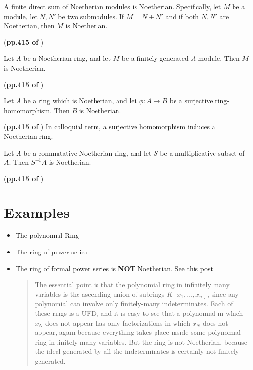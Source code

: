 \documentclass{article}
\begin{document}
\begin{coro}
    \label{coro:Noetherian.1.3}
    A finite direct sum of Noetherian modules is Noetherian. Specifically,
    let $M$ be a module, let $N,N'$ be two submodules. If $M=N+N'$ and if
    both $N,N'$ are Noetherian, then $M$ is Noetherian.
\end{coro}
(\textbf{pp.415 of \cite{lang}})
\begin{prop}
    \label{prop:Noetherian.1.4}
    Let $A$ be a Noetherian ring, and let $M$ be a finitely generated
    $A$-module. Then $M$ is Noetherian.
\end{prop}
(\textbf{pp.415 of \cite{lang}})
\begin{prop}
    \label{prop:Noetherian.1.5}
    Let $A$ be a ring which is Noetherian, and let $\phi:A\to B$ be
    a surjective ring-homomorphism. Then $B$ is Noetherian.
\end{prop}
(\textbf{pp.415 of \cite{lang}})
In colloquial term, a surjective homomorphism induces a Noetherian ring.
\begin{prop}
    \label{prop:Noetherian.1.6}
    Let $A$ be a commutative Noetherian ring, and let $S$ be a
    multiplicative subset of $A$. Then $S^{-1}A$ is Noetherian.
\end{prop}
(\textbf{pp.415 of \cite{lang}})
\section{Examples}
\label{sec:Examples}
\begin{itemize}
    \item The polynomial Ring
    \item The ring of power series
    \item The ring of formal power series is \textbf{NOT} Noetherian.
        See this \href{http://math.stackexchange.com/questions/281597/an-example-of-a-non-noetherian-ufd}{post}
        \begin{quote}
        The essential point is that the polynomial ring in infinitely many variables is the ascending union of subrings $K[x_1,\ldots,x_n]$, since any polynomial can involve only finitely-many indeterminates. Each of these rings is a UFD, and it is easy to see that a polynomial in which $x_N$ does not appear has only factorizations in which $x_N$ does not appear, again because everything takes place inside some polynomial ring in finitely-many variables. But the ring is not Noetherian, because the ideal generated by all the indeterminates is certainly not finitely-generated.
        \end{quote}
\end{itemize}
\end{document}
